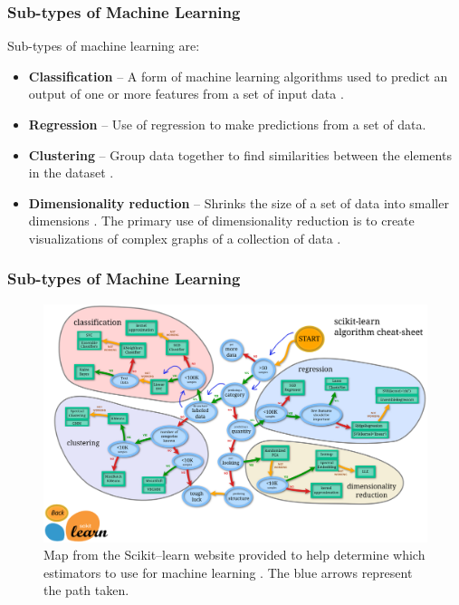 \documentclass{beamer}
\begin{document}
\begin{frame}
\frametitle{Sub-types of Machine Learning}
\footnotesize
Sub-types of machine learning are:
\begin{itemize}
\item \textbf{Classification} -- A form of machine learning algorithms used to predict an output of one or more features from a set of input data \cite{pythonML}.
\item \textbf{Regression} -- Use of regression to make predictions from a set of data.
\item \textbf{Clustering} -- Group data together to find similarities between the elements in the dataset \cite{pythonML}.
\item \textbf{Dimensionality reduction} -- Shrinks the size of a set of data into smaller dimensions \cite{pythonML}. The primary use of dimensionality reduction is to create visualizations of complex graphs of a collection of data \cite{pythonML}. 
\end{itemize}

\end{frame}


\begin{frame}
\frametitle{Sub-types of Machine Learning}

\begin{figure}[!h]
\centering
\includegraphics[scale=0.08]{ml_map}
\caption{ \footnotesize Map from the Scikit--learn website provided to help determine which estimators to use for machine learning \cite{SciKit}. The blue arrows represent the path taken. }
\end{figure}

\end{frame}
\end{document}
